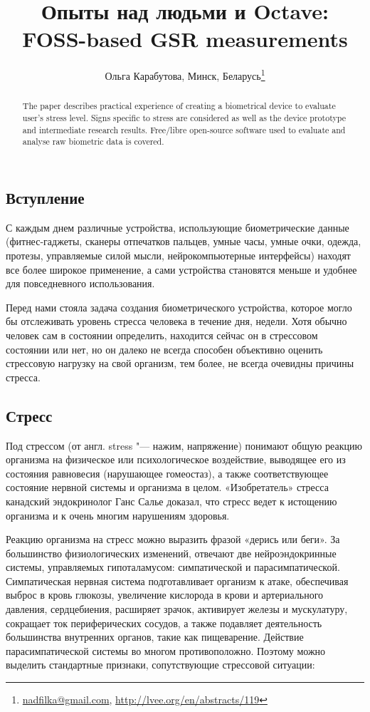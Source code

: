 \documentclass[10pt, a5paper]{article}
\begin{document}
\title{Опыты над людьми и Octave: FOSS-based GSR measurements}
\author{Ольга Карабутова, Минск, Беларусь\footnote{\url{nadfilka@gmail.com}, \url{http://lvee.org/en/abstracts/119}}}
\maketitle
\begin{abstract}
The paper describes practical experience of creating a biometrical device to evaluate user’s stress level. Signs specific to stress are considered as well as the device prototype and intermediate research results. Free/libre open-source software used to evaluate and analyse raw biometric data is covered.
\end{abstract}
\subsection*{Вступление}

С каждым днем различные устройства, использующие биометрические данные (фитнес-гаджеты, сканеры отпечатков пальцев, умные часы, умные очки, одежда, протезы, управляемые силой мысли, нейрокомпьютерные интерфейсы) находят все более широкое применение, а сами устройства становятся меньше и удобнее для повседневного использования.

Перед нами стояла задача  создания биометрического устройства, которое могло бы отслеживать уровень стресса  человека в течение дня, недели.  Хотя обычно человек сам в состоянии определить, находится сейчас он в стрессовом состоянии или нет, но он далеко не всегда способен объективно оценить стрессовую  нагрузку на свой организм, тем более, не всегда очевидны причины стресса.

\subsection*{Стресс}

Под стрессом (от англ. stress "--- нажим, напряжение) понимают общую реакцию организма на физическое или психологическое воздействие, выводящее его из состояния равновесия (нарушающее гомеостаз), а также соответствующее состояние нервной системы и организма в целом.
«Изобретатель» стресса канадский эндокринолог Ганс Салье доказал, что стресс ведет к истощению организма и к очень многим нарушениям здоровья.

Реакцию организма на стресс можно выразить фразой «дерись или беги». За большинство физиологических изменений, отвечают две нейроэндокринные системы, управляемых гипоталамусом: симпатической и парасимпатической. Симпатическая нервная система подготавливает организм к атаке, обеспечивая выброс в кровь глюкозы, увеличение кислорода в крови и артериального давления, сердцебиения, расширяет зрачок, активирует железы и мускулатуру, сокращает ток периферических сосудов, а также подавляет деятельность большинства внутренних органов, такие как пищеварение. Действие парасимпатической системы во многом противоположно. Поэтому можно выделить стандартные признаки, сопутствующие стрессовой ситуации:
\end{document}
